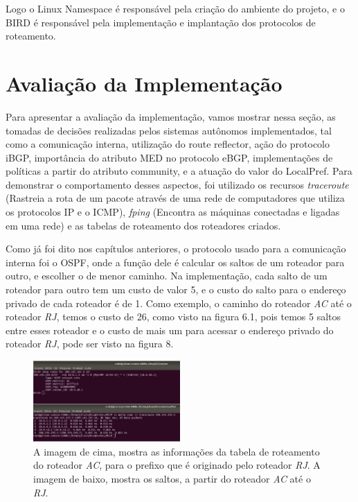 \documentclass[12pt,a4paper]{report}
\begin{document}
Logo o Linux Namespace \'e respons\'avel pela cria\c{c}\~ao do ambiente do projeto, e o BIRD \'e respons\'avel pela implementa\c{c}\~ao e implanta\c{c}\~ao dos protocolos de roteamento.

\chapter{Avalia\c{c}\~ao da Implementa\c{c}\~ao}

Para apresentar a avalia\c{c}\~ao da implementa\c{c}\~ao, vamos mostrar nessa se\c{c}\~ao, as tomadas de decis\~oes realizadas pelos sistemas aut\^onomos implementados, tal como a comunica\c{c}\~ao interna, utiliza\c{c}\~ao do route reflector, a\c{c}\~ao do protocolo iBGP, import\^ancia do atributo MED no protocolo eBGP, implementa\c{c}\~oes de pol\'iticas a partir do atributo community, e a atua\c{c}\~ao do valor do LocalPref. Para demonstrar o comportamento desses aspectos, foi utilizado os recursos \textit{traceroute} (Rastreia a rota de um pacote atrav\'es de uma rede de computadores que utiliza os protocolos IP e o ICMP), \textit{fping} (Encontra as m\'aquinas conectadas e ligadas em uma rede) e as tabelas de roteamento dos roteadores criados.  

Como j\'a foi dito nos cap\'itulos anteriores, o protocolo usado para a comunica\c{c}\~ao interna foi o OSPF, onde a fun\c{c}\~ao dele \'e calcular os saltos de um roteador para outro, e escolher o de menor caminho. Na implementa\c{c}\~ao, cada salto de um roteador para outro tem um custo de valor 5, e o custo do salto para o endere\c{c}o privado de cada roteador \'e de 1. Como exemplo, o caminho do roteador \textit{AC} at\'e o roteador \textit{RJ}, temos o custo de 26, como visto na figura 6.1, pois temos 5 saltos entre esses roteador e o custo de mais um para acessar o endere\c{c}o privado do roteador \textit{RJ}, pode ser visto na figura 8.

\begin{figure}[!htb]
 \centering
 \includegraphics[width=0.5\textwidth]{Imagens/IMAGEM9}
  \caption{\label{fig:imagem9} A imagem de cima, mostra as informa\c{c}\~oes da tabela de roteamento do roteador \textit{AC}, para o prefixo que \'e originado pelo roteador \textit{RJ}. A imagem de baixo, mostra os saltos, a partir do roteador \textit{AC} at\'e o \textit{RJ}.}
\end{figure}
\end{document}
